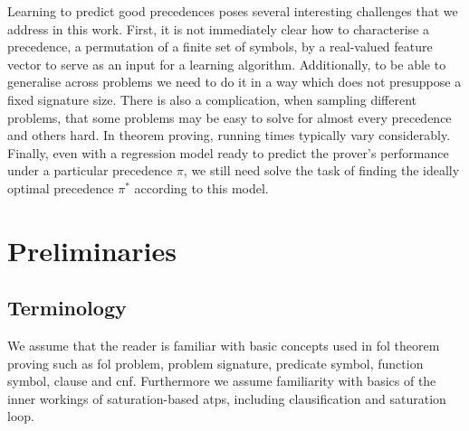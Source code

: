 Learning to predict good precedences poses several interesting challenges that we address in this work.
First, it is not immediately clear how to characterise a precedence, a permutation of a finite set of symbols,
by a real-valued feature vector to serve as an input for a learning algorithm. 
Additionally, to be able to generalise across problems
we need to do it in a way which does not presuppose a fixed signature size. 
There is also a complication, when sampling different problems,
that some problems may be easy to solve for almost every precedence and others hard.
In theorem proving, running times typically vary considerably.
Finally, even with a regression model ready to predict the prover's performance 
under a particular precedence $\pi$, we still need solve the task of finding 
the ideally optimal precedence $\pi^*$ according to this model.







\newpage

\section{Preliminaries}

\subsection{Terminology}

We assume that the reader is familiar with basic concepts used in \gls{fol} theorem proving
such as \gls{fol} problem, problem signature, predicate symbol, function symbol, clause and \gls{cnf}.
Furthermore we assume familiarity with basics of the inner workings of saturation-based \glspl{atp},
including clausification and saturation loop.

